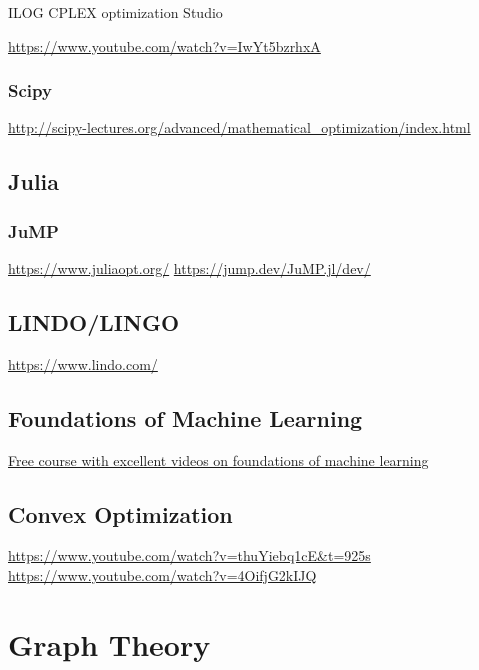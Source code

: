 \documentclass[letter,12pt]{book}
\renewcommand{\0}{\mathbf{0}}
\begin{document}
ILOG CPLEX optimization Studio

\url{https://www.youtube.com/watch?v=IwYt5bzrhxA}



\subsection{Scipy}

\url{http://scipy-lectures.org/advanced/mathematical_optimization/index.html}

\section{Julia}
\subsection{JuMP}
\url{https://www.juliaopt.org/}
\url{https://jump.dev/JuMP.jl/dev/}

\section{LINDO/LINGO}
\url{https://www.lindo.com/}

\section{Foundations of Machine Learning}
\href{https://bloomberg.github.io/foml/#home}{Free course with excellent videos on foundations of machine learning}
\section{Convex Optimization}
\url{https://www.youtube.com/watch?v=thuYiebq1cE&t=925s}
\url{https://www.youtube.com/watch?v=4OifjG2kIJQ}

\chapter{Graph Theory}


	\cleardoublepage
	\printindex

%	
\end{document}
